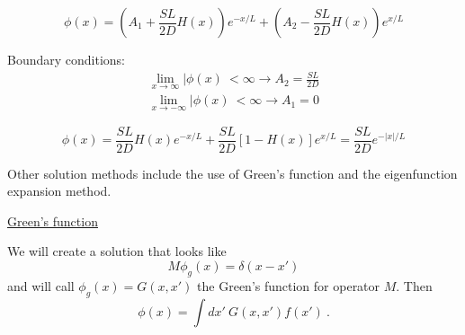 \documentclass[12pt]{article}
\newcommand{\rvec}{\ensuremath{\vec{r}}}
\newcommand{\vecr}{\ensuremath{\vec{r}}}
\begin{document}
\begin{equation*}
\phi(x) = \left(A_1 + \frac{SL}{2D}H(x)\right)e^{-x/L} + \left(A_2 - \frac{SL}{2D}H(x)\right)e^{x/L}
\end{equation*}

Boundary conditions:
\vspace{-5 mm}
\begin{gather*}
\lim\limits_{x\to\infty}|\phi(x)\ < \infty \rightarrow A_2 = \frac{SL}{2D} \\
\lim\limits_{x\to-\infty}|\phi(x)\ < \infty \rightarrow A_1 = 0
\end{gather*}

\begin{equation*}
\phi(x) = \frac{SL}{2D}H(x)e^{-x/L} + \frac{SL}{2D}[1-H(x)]e^{x/L} = \frac{SL}{2D}e^{-|x|/L}
\end{equation*}

Other solution methods include the use of Green's function and the eigenfunction expansion method.

\underline{Green's function}

We will create a solution that looks like
\[M\phi_g(x) = \delta(x-x')\]
and will call $\phi_g(x) = G(x,x')$ the Green's function for operator $M$. Then
\[\phi(x) = \int dx' \: G(x,x') f(x')\:.\]

%
%
%
%
%
%
%
\end{document}
